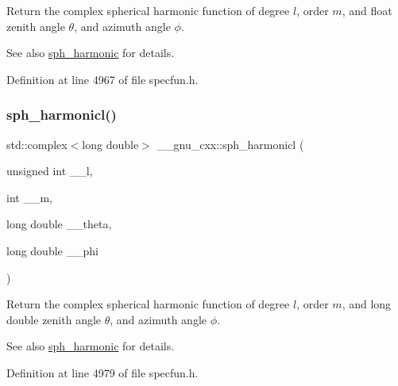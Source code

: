 Return the complex spherical harmonic function of degree $ l $, order $ m $, and {\ttfamily float} zenith angle $ \theta $, and azimuth angle $ \phi $.

\begin{DoxySeeAlso}{See also}
\hyperlink{group__gnu__math__spec__func_gacbff28988d5d36f0c3b3fe03d4f57896}{sph\+\_\+harmonic} for details. 
\end{DoxySeeAlso}


Definition at line 4967 of file specfun.\+h.

\mbox{\label{group__gnu__math__spec__func_ga414c8374b4579aa14e38f5401304b6fa}} 
\subsubsection{\texorpdfstring{sph\+\_\+harmonicl()}{sph\_harmonicl()}}
{\footnotesize\ttfamily std\+::complex$<$long double$>$ \+\_\+\+\_\+gnu\+\_\+cxx\+::sph\+\_\+harmonicl (\begin{DoxyParamCaption}\item[{unsigned int}]{\+\_\+\+\_\+l,  }\item[{int}]{\+\_\+\+\_\+m,  }\item[{long double}]{\+\_\+\+\_\+theta,  }\item[{long double}]{\+\_\+\+\_\+phi }\end{DoxyParamCaption})\hspace{0.3cm}{\ttfamily [inline]}}

Return the complex spherical harmonic function of degree $ l $, order $ m $, and {\ttfamily long double} zenith angle $ \theta $, and azimuth angle $ \phi $.

\begin{DoxySeeAlso}{See also}
\hyperlink{group__gnu__math__spec__func_gacbff28988d5d36f0c3b3fe03d4f57896}{sph\+\_\+harmonic} for details. 
\end{DoxySeeAlso}


Definition at line 4979 of file specfun.\+h.

\mbox{\label{group__gnu__math__spec__func_ga2b955dac7d2c5125f2091eaeb25c8ad2}} 

